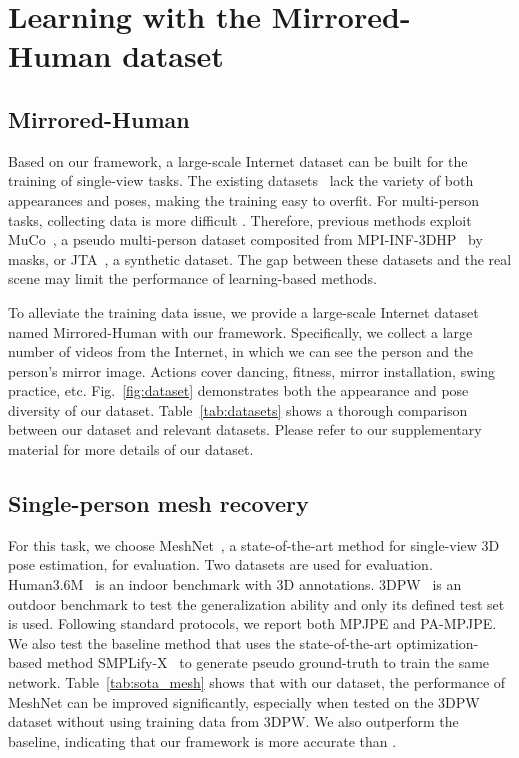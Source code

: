 
\section{Learning with the Mirrored-Human dataset}
\subsection{Mirrored-Human}


Based on our framework, a large-scale Internet dataset can be built for the training of single-view tasks. 
The existing datasets~\cite{h36m_pami, mono-3dhp2017} lack the variety of both appearances and poses, making the training easy to overfit. For multi-person tasks, collecting data is more difficult . 
Therefore, previous methods exploit MuCo~\cite{mehta2018single}, a pseudo multi-person dataset composited from MPI-INF-3DHP~\cite{mono-3dhp2017} by masks, or JTA~\cite{fabbri2018learning}, a synthetic dataset. The gap between these datasets and the real scene may limit the performance of learning-based methods.

To alleviate the training data issue, we provide a large-scale Internet dataset named Mirrored-Human with our framework. Specifically, we collect a large number of videos from the Internet, in which we can see the person and the person’s mirror image. Actions cover dancing, fitness, mirror installation, swing practice, etc. Fig.~\ref{fig:dataset} demonstrates both the appearance and pose diversity of our dataset. 
Table~\ref{tab:datasets} shows a thorough comparison between our dataset and relevant datasets. 
Please refer to our supplementary material for more details of our dataset.


\subsection{Single-person mesh recovery}


For this task, we choose MeshNet~\cite{Moon_2020_ECCV_I2L-MeshNet}, a state-of-the-art method for single-view 3D pose estimation, for evaluation. Two datasets are used for evaluation. Human3.6M~\cite{h36m_pami} is an indoor benchmark with 3D annotations. 3DPW~\cite{vonMarcard2018} is an outdoor benchmark to test the generalization ability and only its defined test set is used. Following standard protocols, we report both MPJPE and PA-MPJPE. We also test the baseline method that uses the state-of-the-art optimization-based method SMPLify-X~\cite{SMPL-X:2019} to generate pseudo ground-truth to train the same network. Table~\ref{tab:sota_mesh} shows that with our dataset, the performance of MeshNet can be improved significantly, especially when tested on the 3DPW dataset without using training data from 3DPW. We also outperform the baseline, indicating that our framework is more accurate than \cite{SMPL-X:2019}.

